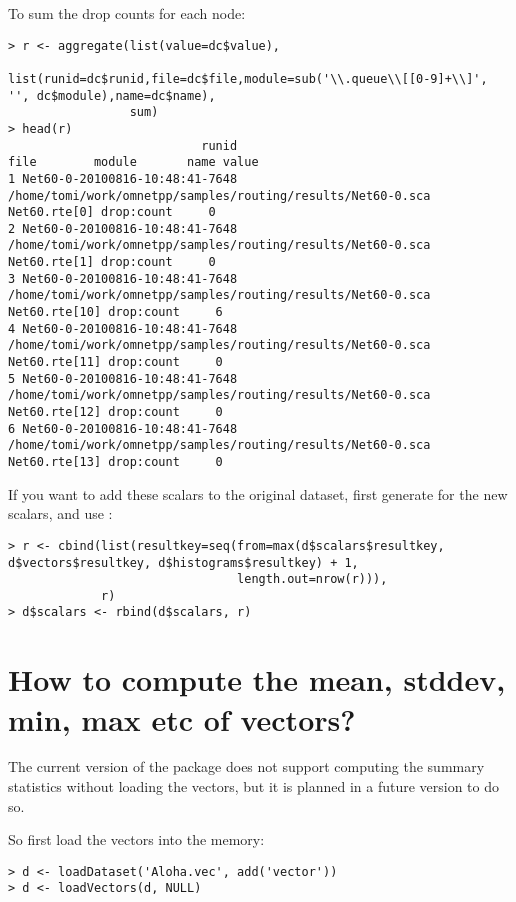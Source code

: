 To sum the drop counts for each node:

\begin{verbatim}
> r <- aggregate(list(value=dc$value),
                 list(runid=dc$runid,file=dc$file,module=sub('\\.queue\\[[0-9]+\\]', '', dc$module),name=dc$name),
                 sum)
> head(r)
                           runid                                                        file        module       name value
1 Net60-0-20100816-10:48:41-7648 /home/tomi/work/omnetpp/samples/routing/results/Net60-0.sca  Net60.rte[0] drop:count     0
2 Net60-0-20100816-10:48:41-7648 /home/tomi/work/omnetpp/samples/routing/results/Net60-0.sca  Net60.rte[1] drop:count     0
3 Net60-0-20100816-10:48:41-7648 /home/tomi/work/omnetpp/samples/routing/results/Net60-0.sca Net60.rte[10] drop:count     6
4 Net60-0-20100816-10:48:41-7648 /home/tomi/work/omnetpp/samples/routing/results/Net60-0.sca Net60.rte[11] drop:count     0
5 Net60-0-20100816-10:48:41-7648 /home/tomi/work/omnetpp/samples/routing/results/Net60-0.sca Net60.rte[12] drop:count     0
6 Net60-0-20100816-10:48:41-7648 /home/tomi/work/omnetpp/samples/routing/results/Net60-0.sca Net60.rte[13] drop:count     0

\end{verbatim}

If you want to add these scalars to the original dataset, first generate  for the new scalars,
and use :

\begin{verbatim}
> r <- cbind(list(resultkey=seq(from=max(d$scalars$resultkey, d$vectors$resultkey, d$histograms$resultkey) + 1,
                                length.out=nrow(r))),
             r)
> d$scalars <- rbind(d$scalars, r)
\end{verbatim}

\section{How to compute the mean, stddev, min, max etc of vectors?}

The current version of the  package does not support computing
the summary statistics without loading the vectors, but it is planned in a future
version to do so.

So first load the vectors into the memory:

\begin{verbatim}
> d <- loadDataset('Aloha.vec', add('vector'))
> d <- loadVectors(d, NULL)
\end{verbatim}

